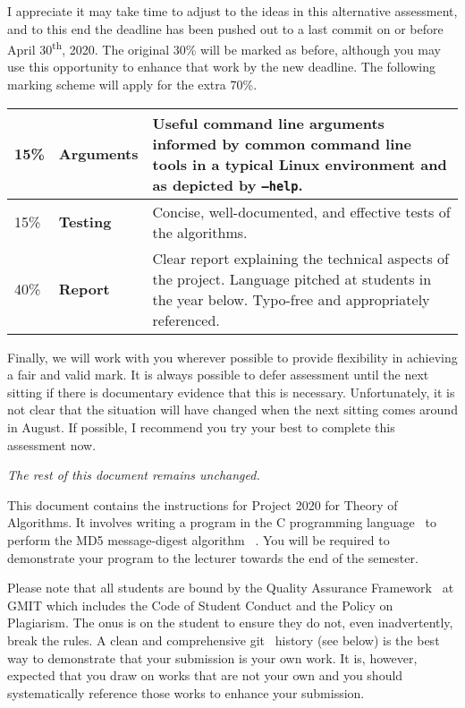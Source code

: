 \documentclass[12pt, a4paper]{article}
\newcommand{\modulename}{Theory of Algorithms}
\newcommand{\projectyear}{2020}
\newcommand{\projectname}{Project \projectyear}
\newcommand{\duedate}{last commit on or before April 30\textsuperscript{th}, 2020}
\begin{document}
\noindent
I appreciate it may take time to adjust to the ideas in this alternative assessment, and to this end the deadline has been pushed out to a \duedate.
The original 30\% will be marked as before, although you may use this opportunity to enhance that work by the new deadline.
The following marking scheme will apply for the extra 70\%.


\begin{center}
  \begin{tabular}{llp{8.4cm}}
    \toprule
    15\% & \textbf{Arguments} & Useful command line arguments informed by common command line tools in a typical Linux environment and as depicted by \texttt{--help}. \\
    \midrule
    15\% & \textbf{Testing} & Concise, well-documented, and effective tests of the algorithms. \\
    \midrule
    40\% & \textbf{Report} & Clear report explaining the technical aspects of the project. Language pitched at students in the year below. Typo-free and appropriately referenced. \\
    \bottomrule
  \end{tabular}
\end{center}


Finally, we will work with you wherever possible to provide flexibility in achieving a fair and valid mark.
It is always possible to defer assessment until the next sitting if there is documentary evidence that this is necessary.
Unfortunately, it is not clear that the situation will have changed when the next sitting comes around in August.
If possible, I recommend you try your best to complete this assessment now.
\vspace{4mm}

\noindent \emph{The rest of this document remains unchanged.}


\maketitle

\noindent
This document contains the instructions for \projectname{} for \modulename{}.
It involves writing a program in the C programming language~\cite{cstandard} to perform the MD5 message-digest algorithm ~\cite{md5}.
You will be required to demonstrate your program to the lecturer towards the end of the semester.

Please note that all students are bound by the Quality Assurance Framework~\cite{gmitqaf} at GMIT which includes the Code of Student Conduct and the Policy on Plagiarism.
The onus is on the student to ensure they do not, even inadvertently, break the rules.
A clean and comprehensive git~\cite{git} history (see below) is the best way to demonstrate that your submission is your own work.
It is, however, expected that you draw on works that are not your own and you should systematically reference those works to enhance your submission.
\end{document}

